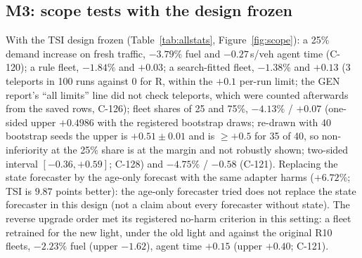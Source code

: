 \documentclass[11pt]{article}
\begin{document}
\subsection{M3: scope tests with the design frozen}\label{sec:scope}
With the TSI design frozen (Table~\ref{tab:allstats}, Figure~\ref{fig:scope}): a 25\% demand increase on fresh traffic, $-3.79\%$ fuel and $-0.27$\,s/veh agent
time (C-120); a rule fleet, $-1.84\%$ and $+0.03$; a search-fitted fleet, $-1.38\%$ and $+0.13$ (3 teleports in 100 runs against 0 for R, within the $+0.1$ per-run limit; the GEN report's ``all limits'' line did not check teleports, which were counted afterwards from the saved rows, C-126); fleet shares of 25 and 75\%, $-4.13\%$
/ $+0.07$ (one-sided upper $+0.4986$ with the registered bootstrap draws; re-drawn with 40 bootstrap seeds the upper is
$+0.51\pm0.01$ and is $\ge+0.5$ for 35 of 40, so non-inferiority at the 25\% share is at the margin and not robustly shown; two-sided
interval $[-0.36, +0.59]$; C-128) and $-4.75\%$ / $-0.58$ (C-121). Replacing the state forecaster by the age-only forecast with the same
adapter harms ($+6.72\%$; TSI is $9.87$ points better): the age-only forecaster tried does not replace the state forecaster in this
design (not a claim about every forecaster without state). The reverse upgrade order met its registered no-harm criterion
in this setting: a fleet retrained for the new light, under the old light and against the original R10
fleets, $-2.23\%$ fuel (upper $-1.62$), agent time $+0.15$ (upper $+0.40$; C-121).
\end{document}
